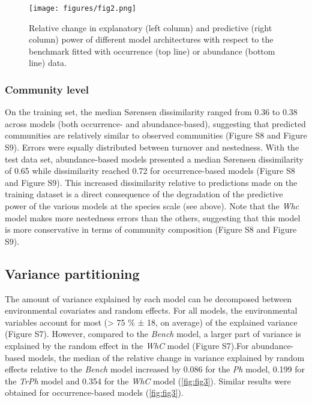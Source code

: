 \documentclass[9pt,biorxiv,doublespacing,lineno,endfloat]{lapreprint}
\begin{document}
\begin{figure}
\hypertarget{fig:fig2}{%
\centering
\texttt{[image: figures/fig2.png]}
\caption{Relative change in explanatory (left column) and predictive
(right column) power of different model architectures with respect to
the benchmark fitted with occurrence (top line) or abundance (bottom
line) data.}\label{fig:fig2}
}
\end{figure}

\hypertarget{community-level}{%
\subsubsection{Community level}\label{community-level}}

On the training set, the median Sørensen dissimilarity ranged from 0.36
to 0.38 across models (both occurrence- and abundance-based), suggesting
that predicted communities are relatively similar to observed
communities (Figure S8 and Figure S9). Errors were equally distributed
between turnover and nestedness. With the test data set, abundance-based
models presented a median Sørensen dissimilarity of 0.65 while
dissimilarity reached 0.72 for occurrence-based models (Figure S8 and
Figure S9). This increased dissimilarity relative to predictions made on
the training dataset is a direct consequence of the degradation of the
predictive power of the various models at the species scale (see above).
Note that the \emph{Whc} model makes more nestedness errors than the
others, suggesting that this model is more conservative in terms of
community composition (Figure S8 and Figure S9).

\hypertarget{variance-partitioning}{%
\subsection{Variance partitioning}\label{variance-partitioning}}

The amount of variance explained by each model can be decomposed between
environmental covariates and random effects. For all models, the
environmental variables account for most (\textgreater{} 75 \% ± 18, on
average) of the explained variance (Figure S7). However, compared to the
\emph{Bench} model, a larger part of variance is explained by the random
effect in the \emph{WhC} model (Figure S7).For abundance-based models,
the median of the relative change in variance explained by random
effects relative to the \emph{Bench} model increased by 0.086 for the
\emph{Ph} model, 0.199 for the \emph{TrPh} model and 0.354 for the
\emph{WhC} model (\cref{fig:fig3}). Similar results were obtained for
occurrence-based models (\cref{fig:fig3}).
\end{document}
